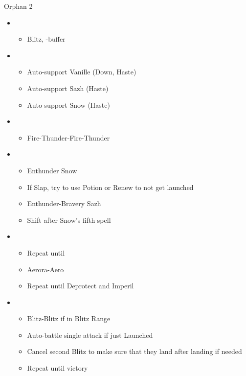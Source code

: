 \begin{battle}{Orphan 2}
\begin{itemize}
    \item \second
    \begin{itemize}
        \item Blitz, \syn-buffer
    \end{itemize}
    \item \fourth
    \begin{itemize}
        \item Auto-support Vanille (Down, Haste)
        \item Auto-support Sazh (Haste)
        \item Auto-support Snow (Haste)
    \end{itemize}
    \item \sixth
    \begin{itemize}
        \item Fire-Thunder-Fire-Thunder
    \end{itemize}
    \item \fourth
    \begin{itemize}
        \item Enthunder Snow
        \item If Slap, try to use Potion or Renew to not get launched
        \item Enthunder-Bravery Sazh
        \item Shift after Snow's fifth spell
    \end{itemize}
    \item \fifth
    \begin{itemize}
        \item Repeat until \stagger
        \item Aerora-Aero
        \item Repeat until Deprotect and Imperil
    \end{itemize}
    \item \first
    \begin{itemize}
        \item Blitz-Blitz if in Blitz Range
        \item Auto-battle single attack if just Launched
        \item Cancel second Blitz to make sure that they land after landing if needed
        \item Repeat until victory
    \end{itemize}
\end{itemize}
\end{battle}